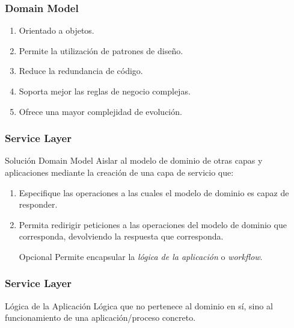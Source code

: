 \documentclass[a4paper,slidestop,xcolor=pst,dvips,blue]{beamer}
\begin{document}
\begin{frame}[c]
    \frametitle{Domain Model}
    \begin{enumerate}
        \item<2-> Orientado a objetos.
        \item<3-> Permite la utilización de patrones de diseño.
        \item<4-> Reduce la redundancia de código.
        \item<5-> Soporta mejor las reglas de negocio complejas.
        \item<6-> Ofrece una mayor complejidad de evolución.
    \end{enumerate}
\end{frame}

\begin{frame}[c]
    \frametitle{Service Layer}
    \begin{block}{Solución Domain Model}
        Aislar al modelo de dominio de otras capas y aplicaciones mediante la creación de una capa de servicio que:
        \begin{enumerate}
            \item Especifique las operaciones a las cuales el modelo de dominio es capaz de responder.
            \item Permita redirigir peticiones a las operaciones del modelo de dominio que corresponda, devolviendo la respuesta que corresponda.
            \item [Opcional] Permite encapsular la \emph{lógica de la aplicación} o \emph{workflow}.
        \end{enumerate}
    \end{block}
\end{frame}

\begin{frame}[c]
    \frametitle{Service Layer}
    \begin{block}{Lógica de la Aplicación}
        Lógica que no pertenece al dominio en sí, sino al funcionamiento de una aplicación/proceso concreto.
    \end{block}
\end{frame}
\end{document}
